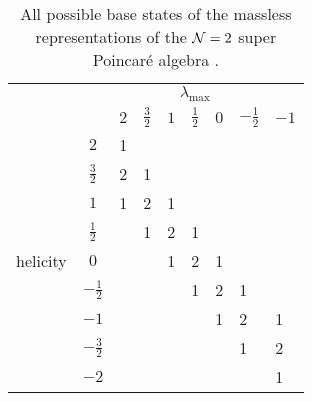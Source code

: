 \begin{table}[!h]
\centering
\def\arraystretch{1.5}
\begin{tabular}{m{0.7cm}m{0.7cm}m{0.7cm}m{0.7cm}m{0.7cm}m{0.7cm}m{0.7cm}m{0.7cm}m{0.7cm}}
         &                                     &     &               & \multicolumn{3}{c}{$\lambda_{\text{max}}$} &                &      \\
         & \multicolumn{1}{c|}{}               & $2$ & $\frac{3}{2}$ & $1$       & $\frac{1}{2}$       & $0$      & $-\frac{1}{2}$ & $-1$ \\ \cline{2-9} 
         & \multicolumn{1}{c|}{$2$}            & 1   &               &           &                     &          &                &      \\
         & \multicolumn{1}{c|}{$\frac{3}{2}$}  & 2   & 1             &           &                     &          &                &      \\
         & \multicolumn{1}{c|}{$1$}            & 1   & 2             & 1         &                     &          &                &      \\
         & \multicolumn{1}{c|}{$\frac{1}{2}$}  &     & 1             & 2         & 1                   &          &                &      \\
helicity & \multicolumn{1}{c|}{$0$}            &     &               & 1         & 2                   & 1        &                &      \\
         & \multicolumn{1}{c|}{$-\frac{1}{2}$} &     &               &           & 1                   & 2        & 1              &      \\
         & \multicolumn{1}{c|}{$-1$}           &     &               &           &                     & 1        & 2              & 1    \\
         & \multicolumn{1}{c|}{$-\frac{3}{2}$} &     &               &           &                     &          & 1              & 2    \\
         & \multicolumn{1}{c|}{$-2$}           &     &               &           &                     &          &                & 1   
\end{tabular}
\caption[All possible base states of the massless representations of the $\N = 2$ super Poincar\'e algebra]{All possible base states of the massless representations of the $\N = 2$ super Poincar\'e algebra \cite{Wess:1992cp}.}
\label{table:allirreps}
\end{table}

